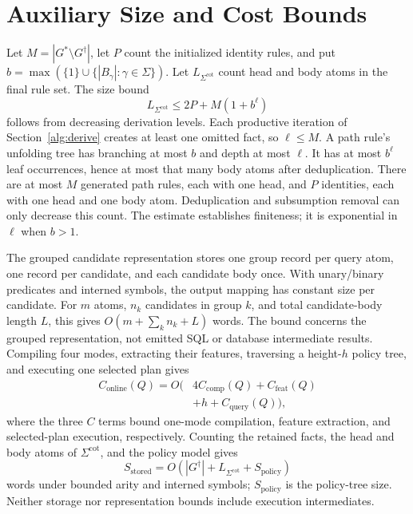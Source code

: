 \documentclass[conference]{IEEEtran}
\theoremstyle{definition}
\newcommand{\Gc}{G^{\dagger}}
\newcommand{\Sig}{\Sigma}
\newcommand{\Sigcot}{\Sig^{\mathrm{cot}}}
\newcommand{\algref}[1]{Section~\ref{#1}}
\begin{document}
\balance
\section{Auxiliary Size and Cost Bounds}
\label{sec:bounds}
Let $M=|G^{*}\setminus\Gc|$, let $P$ count the initialized identity
rules, and put $b=\max(\{1\}\cup\{|B_\gamma|:\gamma\in\Sig\})$.
Let $L_{\Sigcot}$ count head and body atoms in the final rule set.
The size bound
\begin{equation}
\label{eq:cot-size-bound}
L_{\Sigcot}\leq 2P+M(1+b^{\ell})
\end{equation}
follows from decreasing derivation levels. Each productive
iteration of \algref{alg:derive} creates at least one omitted fact,
so $\ell\leq M$. A path rule's unfolding tree has branching at
most $b$ and depth at most $\ell$. It has at most $b^{\ell}$ leaf
occurrences, hence at most that many body atoms after
deduplication. There are at most $M$ generated path rules, each
with one head, and $P$ identities, each with one head and one
body atom.
Deduplication and subsumption removal can only decrease this
count. The estimate establishes finiteness; it is exponential
in $\ell$ when $b>1$.

The grouped candidate representation stores one group record
per query atom, one record per candidate, and each candidate
body once. With unary/binary predicates and interned symbols,
the output mapping has constant size per candidate. For $m$
atoms, $n_k$ candidates in group $k$, and total candidate-body
length $L$, this gives $O(m+\sum_k n_k+L)$ words. The bound concerns the grouped
representation, not emitted SQL or database intermediate results.
Compiling four modes, extracting their features, traversing a
height-$h$ policy tree, and executing one selected plan gives
\begin{equation}
\label{eq:online-cost}
\begin{aligned}
C_{\mathrm{online}}(Q)=O\bigl(&4C_{\mathrm{comp}}(Q)
+C_{\mathrm{feat}}(Q)\\
&+h+C_{\mathrm{query}}(Q)\bigr),
\end{aligned}
\end{equation}
where the three $C$ terms bound one-mode compilation, feature
extraction, and selected-plan execution, respectively. Counting the
retained facts, the head and body atoms of $\Sigcot$, and the policy
model gives
\begin{equation}
\label{eq:stored-space}
S_{\mathrm{stored}}=O(|\Gc|+L_{\Sigcot}+S_{\mathrm{policy}})
\end{equation}
words under bounded arity and interned symbols; $S_{\mathrm{policy}}$
is the policy-tree size. Neither storage nor representation bounds
include execution intermediates.
\end{document}

